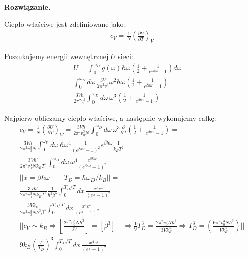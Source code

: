 \documentclass[11pt,a4paper]{article}
\newenvironment{solution}{\vspace{1cm} \par\textbf{Rozwiązanie.} \vspace{1cm}}{}
\begin{document}
\begin{solution}

Ciepło właściwe jest zdefiniowane jako:
\begin{align*}
  c_V = \frac{1}{N} \left( \frac{\partial U}{\partial T} \right)_V
\end{align*}

Poszukujemy energii wewnętrznej $U$ sieci:
\begin{align*}
  U = \int_0^{\omega_D} g(\omega) \hbar \omega \left( \frac{1}{2} + \frac{1}{e^{\beta \hbar \omega} - 1} \right) d\omega = \\
  \int_0^{\omega_D} d\omega \, \frac{3V}{2\pi^2 v_0^3} \omega^2 \hbar \omega \left( \frac{1}{2} + \frac{1}{e^{\beta \hbar \omega} - 1} \right) = \\
  \frac{3V \hbar}{2\pi^2 v_0^3} \int_0^{\omega_D} d\omega \, \omega^3 \left( \frac{1}{2} + \frac{1}{e^{\beta \hbar \omega} - 1} \right)
\end{align*}

Najpierw obliczamy ciepło właściwe, a następnie wykonujemy całkę:
\begin{align*}
  c_V = \frac{1}{N} \left( \frac{\partial U}{\partial T} \right)_V = 
  \frac{3 V \hbar}{2\pi^2 v_0^3 N} \int_0^{\omega_D} d\omega \, \omega^3 \frac{\partial}{\partial T} \left( \frac{1}{2} + \frac{1}{e^{\beta \hbar \omega} - 1} \right) = \\
  \frac{3 V \hbar}{2\pi^2 v_0^3 N} \int_{0}^{\omega_D} d\omega \, \hbar  \omega^4 \frac{1}{(e^{\beta \hbar \omega} - 1)^2} e^{\beta \hbar \omega} \frac{1}{k_B T^2} = \\
  \frac{3 V \hbar^2}{2\pi^2 v_0^3 N k_B T^2} \int_{0}^{\omega_D} d\omega \, \omega^4 \frac{e^{\beta \hbar \omega}}{(e^{\beta \hbar \omega} - 1)^2} = \\
  || x = \beta \hbar \omega  \qquad T_D = \hbar \omega_D / k_B || = \\
  \frac{3 V \hbar^2}{2\pi^2 v_0^3 N k_B T^2} \frac{1}{\hbar^{5}\beta^5} \int_0^{T_D/T} dx \, \frac{x^4 e^{x}}{(e^{x} - 1)^2} = \\
 \frac{3 V k_B}{2\pi^2 v_0^3  N \hbar^3 \beta^3} \int_0^{T_D/T} dx \, \frac{x^4 e^{x}}{(e^{x} - 1)^2} = \\
 || c_V \sim k_B \Rightarrow \left[\frac{2\pi^2 v_0^3  N \hbar^3}{3 V} \right] =  [\beta^3] \quad \Rightarrow
     \frac{1}{9}T_D^{3} = \frac{2\pi^2 v_0^3  N \hbar^3}{3 V k_B^3} \Rightarrow
     T_D^{3} = \left( \frac{6\pi^2 v_0^3  N \hbar^3}{V k_B^3} \right) || \\
  9 k_B \left( \frac{T}{T_D} \right)^3 \int_0^{T_D/T} dx \, \frac{x^4 e^{x}}{(e^{x} - 1)^2}
\end{align*}


\end{solution}
\end{document}
